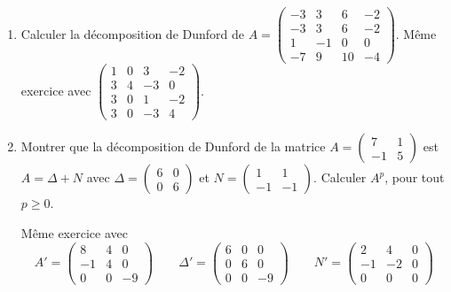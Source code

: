 \documentclass[12pt, class=report,crop=false]{standalone}
\begin{document}
\begin{miniexercices}
\begin{enumerate}
  
\item Calculer la décomposition de Dunford de 
$A = \left(\begin{smallmatrix}
-3 & 3 & 6 & -2 \\
-3 & 3 & 6 & -2 \\
1 & -1 & 0 & 0 \\
-7 & 9 & 10 & -4
  \end{smallmatrix}\right)$.
  Même exercice avec
 $\left(\begin{smallmatrix}
 1 & 0 & 3 & -2 \\
3 & 4 & -3 & 0 \\
3 & 0 & 1 & -2 \\
3 & 0 & -3 & 4
  \end{smallmatrix}\right)$.
  
  
  
  
  \item Montrer que la décomposition de Dunford de la matrice
$A = \left(\begin{smallmatrix}
7 & 1 \\
-1 & 5
  \end{smallmatrix}\right)$
  est $A = \Delta + N$ avec
  $\Delta = \left(\begin{smallmatrix}
6 & 0 \\
0 & 6
  \end{smallmatrix}\right)$
  et $N = \left(\begin{smallmatrix}
1 & 1 \\
-1 & -1
  \end{smallmatrix}\right)$.
  Calculer $A^p$, pour tout $p\ge0$. 
  
  Même exercice avec 
  $$A' = \left(\begin{smallmatrix}
8 & 4 & 0 \\
-1 & 4 & 0 \\
0 & 0 & -9
  \end{smallmatrix}\right)\qquad
\Delta' =  \left(\begin{smallmatrix}
6 & 0 & 0 \\
0 & 6 & 0 \\
0 & 0 & -9
  \end{smallmatrix}\right) \qquad
N' = \left(\begin{smallmatrix}
2 & 4 & 0 \\
-1 & -2 & 0 \\
0 & 0 & 0
  \end{smallmatrix}\right)  
  $$
\end{enumerate}
\end{miniexercices}
\end{document}
